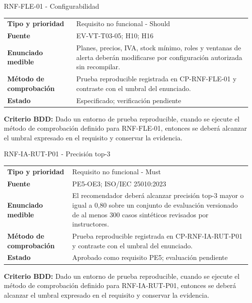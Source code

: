 \begin{reqbox}[colframe=Teal]{RNF-FLE-01 - Configurabilidad}
\begin{tabularx}{\textwidth}{>{\bfseries}p{3.2cm}Y}
Tipo y prioridad & Requisito no funcional - Should \\
Fuente & EV-VT-T03-05; H10; H16 \\
Enunciado medible & Planes, precios, IVA, stock mínimo, roles y ventanas de alerta deberán modificarse por configuración autorizada sin recompilar. \\
Método de comprobación & Prueba reproducible registrada en CP-RNF-FLE-01 y contraste con el umbral del enunciado. \\
Estado & Especificado; verificación pendiente \\
\end{tabularx}
\textbf{Criterio BDD:} Dado un entorno de prueba reproducible, cuando se ejecute el método de comprobación definido para RNF-FLE-01, entonces se deberá alcanzar el umbral expresado en el requisito y conservar la evidencia.
\end{reqbox}


\begin{reqbox}[colframe=Teal]{RNF-IA-RUT-P01 - Precisión top-3}
\begin{tabularx}{\textwidth}{>{\bfseries}p{3.2cm}Y}
Tipo y prioridad & Requisito no funcional - Must \\
Fuente & PE5-OE3; ISO/IEC 25010:2023 \\
Enunciado medible & El recomendador deberá alcanzar precisión top-3 mayor o igual a 0,80 sobre un conjunto de evaluación versionado de al menos 300 casos sintéticos revisados por instructores. \\
Método de comprobación & Prueba reproducible registrada en CP-RNF-IA-RUT-P01 y contraste con el umbral del enunciado. \\
Estado & Aprobado como requisito PE5; evaluación pendiente \\
\end{tabularx}
\textbf{Criterio BDD:} Dado un entorno de prueba reproducible, cuando se ejecute el método de comprobación definido para RNF-IA-RUT-P01, entonces se deberá alcanzar el umbral expresado en el requisito y conservar la evidencia.
\end{reqbox}


